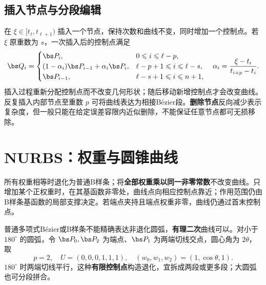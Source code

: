 \subsection{插入节点与分段编辑}
在 $\xi\in[t_\ell,t_{\ell+1})$ 插入一个节点，保持次数和曲线不变，同时增加一个控制点。若 $\xi$ 原重数为 $s$，一次插入后的控制点满足
\[
 \bs Q_i=\begin{cases}
 \bs P_i,&0\leq i\leq\ell-p,\\
 (1-\alpha_i)\bs P_{i-1}+\alpha_i\bs P_i,
     &\ell-p+1\leq i\leq\ell-s,\\
 \bs P_{i-1},&\ell-s+1\leq i\leq n+1,
 \end{cases}
 \quad \alpha_i=\frac{\xi-t_i}{t_{i+p}-t_i}.
\]
插入过程重新分配控制点而不改变几何形状；随后移动新增控制点才会改变曲线。反复插入内部节点至重数 $p$ 可将曲线表达为相接Bézier段。\textbf{删除节点}反向减少表示复杂度，但一般只能在给定误差容限内近似删除，不能保证任意节点都可无损移除。

\section{NURBS：权重与圆锥曲线}


所有权重相等时退化为普通B样条；将\textbf{全部权重乘以同一非零常数}不改变曲线。只增加某个正权重时，在其基函数非零处，曲线点向相应控制点靠近；作用范围仍由B样条基函数的局部支撑决定。若端点夹持且端点权重非零，曲线仍通过首末控制点。

普通多项式Bézier或B样条不能精确表达非退化圆弧，\textbf{有理二次}曲线可以。对小于 $180^\circ$ 的圆弧，令 $\bs P_0,\bs P_2$ 为端点、$\bs P_1$ 为两端切线交点，圆心角为 $2\theta$，取
\[
 p=2,\quad U=(0,0,0,1,1,1),\quad
 (w_0,w_1,w_2)=(1,\cos\theta,1).
\]
$180^\circ$ 时两端切线平行，这种\textbf{有限控制点}构造退化，宜拆成两段或更多段；大圆弧也可分段拼合。



